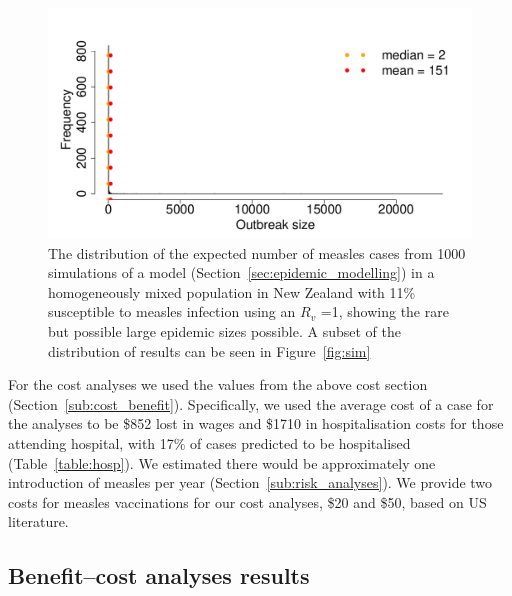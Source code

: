 \documentclass{article}
\begin{document}
\begin{figure}
     \centering
\includegraphics{interimreport2-037}
     \caption{The distribution of the expected number of measles cases from 1000 simulations of a model (Section~\ref{sec:epidemic_modelling}) in a homogeneously mixed population in New Zealand with 11\% susceptible to measles infection using an $R_v$ =1, showing the rare but possible large epidemic sizes possible. A subset of the distribution of results can be seen in Figure~\ref{fig:sim}}
     \label{fig:sim1}
\end{figure}


For the cost analyses we used the values from the above cost section (Section~\ref{sub:cost_benefit}). Specifically, we used the average cost of a case for the analyses to be \$852 lost in wages and \$1710 in hospitalisation costs for those attending hospital, with 17\% of cases predicted to be hospitalised (Table~\ref{table:hosp}). We estimated there would be approximately one introduction of measles per year (Section~\ref{sub:risk_analyses}). We provide two costs for measles vaccinations for our cost analyses, \$20 and \$50, based on US literature.

\subsection{Benefit--cost analyses results}
\end{document}
